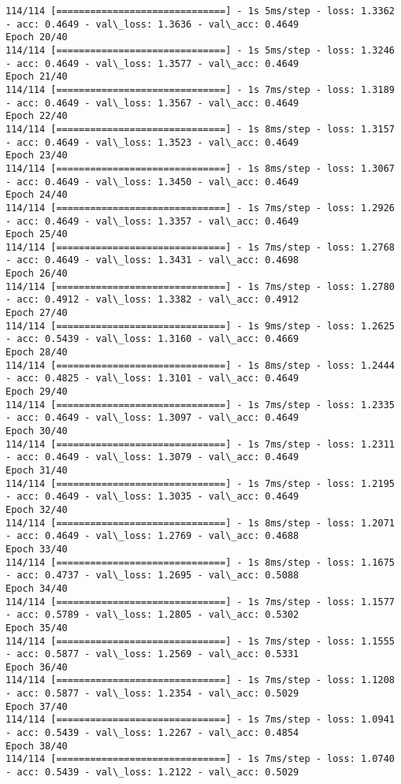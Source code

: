 \documentclass[11pt]{article}
\begin{document}
\begin{Verbatim}[commandchars=\\\{\}]
114/114 [==============================] - 1s 5ms/step - loss: 1.3362 - acc: 0.4649 - val\_loss: 1.3636 - val\_acc: 0.4649
Epoch 20/40
114/114 [==============================] - 1s 5ms/step - loss: 1.3246 - acc: 0.4649 - val\_loss: 1.3577 - val\_acc: 0.4649
Epoch 21/40
114/114 [==============================] - 1s 7ms/step - loss: 1.3189 - acc: 0.4649 - val\_loss: 1.3567 - val\_acc: 0.4649
Epoch 22/40
114/114 [==============================] - 1s 8ms/step - loss: 1.3157 - acc: 0.4649 - val\_loss: 1.3523 - val\_acc: 0.4649
Epoch 23/40
114/114 [==============================] - 1s 8ms/step - loss: 1.3067 - acc: 0.4649 - val\_loss: 1.3450 - val\_acc: 0.4649
Epoch 24/40
114/114 [==============================] - 1s 7ms/step - loss: 1.2926 - acc: 0.4649 - val\_loss: 1.3357 - val\_acc: 0.4649
Epoch 25/40
114/114 [==============================] - 1s 7ms/step - loss: 1.2768 - acc: 0.4649 - val\_loss: 1.3431 - val\_acc: 0.4698
Epoch 26/40
114/114 [==============================] - 1s 7ms/step - loss: 1.2780 - acc: 0.4912 - val\_loss: 1.3382 - val\_acc: 0.4912
Epoch 27/40
114/114 [==============================] - 1s 9ms/step - loss: 1.2625 - acc: 0.5439 - val\_loss: 1.3160 - val\_acc: 0.4669
Epoch 28/40
114/114 [==============================] - 1s 8ms/step - loss: 1.2444 - acc: 0.4825 - val\_loss: 1.3101 - val\_acc: 0.4649
Epoch 29/40
114/114 [==============================] - 1s 7ms/step - loss: 1.2335 - acc: 0.4649 - val\_loss: 1.3097 - val\_acc: 0.4649
Epoch 30/40
114/114 [==============================] - 1s 7ms/step - loss: 1.2311 - acc: 0.4649 - val\_loss: 1.3079 - val\_acc: 0.4649
Epoch 31/40
114/114 [==============================] - 1s 7ms/step - loss: 1.2195 - acc: 0.4649 - val\_loss: 1.3035 - val\_acc: 0.4649
Epoch 32/40
114/114 [==============================] - 1s 8ms/step - loss: 1.2071 - acc: 0.4649 - val\_loss: 1.2769 - val\_acc: 0.4688
Epoch 33/40
114/114 [==============================] - 1s 8ms/step - loss: 1.1675 - acc: 0.4737 - val\_loss: 1.2695 - val\_acc: 0.5088
Epoch 34/40
114/114 [==============================] - 1s 7ms/step - loss: 1.1577 - acc: 0.5789 - val\_loss: 1.2805 - val\_acc: 0.5302
Epoch 35/40
114/114 [==============================] - 1s 7ms/step - loss: 1.1555 - acc: 0.5877 - val\_loss: 1.2569 - val\_acc: 0.5331
Epoch 36/40
114/114 [==============================] - 1s 7ms/step - loss: 1.1208 - acc: 0.5877 - val\_loss: 1.2354 - val\_acc: 0.5029
Epoch 37/40
114/114 [==============================] - 1s 7ms/step - loss: 1.0941 - acc: 0.5439 - val\_loss: 1.2267 - val\_acc: 0.4854
Epoch 38/40
114/114 [==============================] - 1s 7ms/step - loss: 1.0740 - acc: 0.5439 - val\_loss: 1.2122 - val\_acc: 0.5029

\end{Verbatim}
\end{document}
